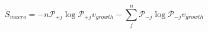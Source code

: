 \begin{equation}
\dot S_{macro} = -n\mathcal P_{+j}\log\mathcal P_{+j}v_{growth} -\sum_j^n\mathcal P_{-j}\log\mathcal P_{-j} v_{growth}
\end{equation}